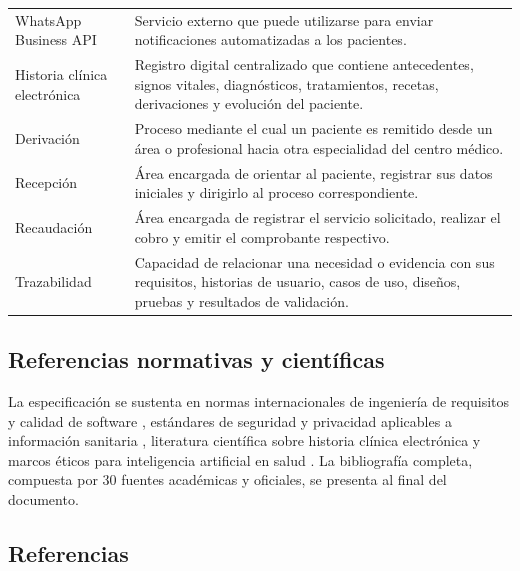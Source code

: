 \documentclass[11pt,a4paper]{article}
\begin{document}
\begin{longtable}{p{} p{}}
		WhatsApp Business API &
		Servicio externo que puede utilizarse para enviar notificaciones automatizadas a los pacientes. \\
		
		Historia clínica electrónica &
		Registro digital centralizado que contiene antecedentes, signos vitales, diagnósticos, tratamientos, recetas, derivaciones y evolución del paciente. \\
		
		Derivación &
		Proceso mediante el cual un paciente es remitido desde un área o profesional hacia otra especialidad del centro médico. \\
		
		Recepción &
		Área encargada de orientar al paciente, registrar sus datos iniciales y dirigirlo al proceso correspondiente. \\
		
		Recaudación &
		Área encargada de registrar el servicio solicitado, realizar el cobro y emitir el comprobante respectivo. \\
		
		Trazabilidad &
		Capacidad de relacionar una necesidad o evidencia con sus requisitos, historias de usuario, casos de uso, diseños, pruebas y resultados de validación. \\
		
	\end{longtable}
	
	
	\subsection{ Referencias normativas y científicas}
	
	La especificación se sustenta en normas internacionales de ingeniería de
	requisitos y calidad de software \cite{iso29148,iso25010}, estándares de
	seguridad y privacidad aplicables a información sanitaria
	\cite{iso27001,iso27799,nist80053,loppd}, literatura científica sobre historia
	clínica electrónica \cite{hayrinen2008,menachemi2011,campanella2016} y marcos
	éticos para inteligencia artificial en salud \cite{whoai2021,topol2019}.
	La bibliografía completa, compuesta por 30 fuentes académicas y oficiales,
	se presenta al final del documento.
	
	\subsection{ Referencias}
	
	\nocite{*}
	
	
	
\end{document}
